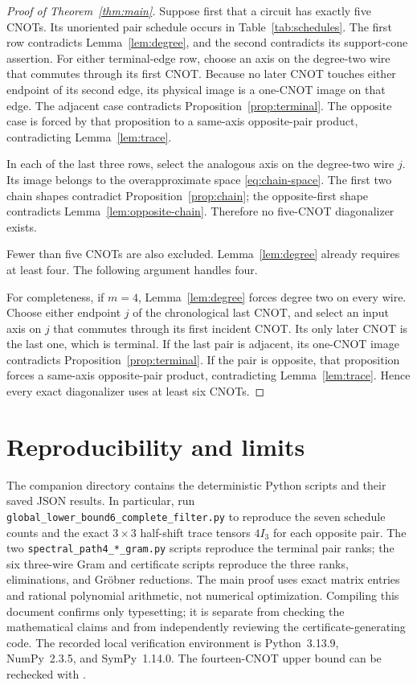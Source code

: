 \documentclass[11pt]{article}
\begin{document}
\begin{proof}[Proof of Theorem~\ref{thm:main}]
Suppose first that a circuit has exactly five CNOTs.  Its unoriented
pair schedule occurs in Table~\ref{tab:schedules}.  The first row
contradicts Lemma~\ref{lem:degree}, and the second contradicts its
support-cone assertion.  For either terminal-edge row, choose an axis on
the degree-two wire that commutes through its first CNOT.  Because no
later CNOT touches either endpoint of its second edge, its physical
image is a one-CNOT image on that edge.  The adjacent case contradicts
Proposition~\ref{prop:terminal}.  The opposite case is forced by that
proposition to a same-axis opposite-pair product, contradicting
Lemma~\ref{lem:trace}.

In each of the last three rows, select the analogous axis on the
degree-two wire $j$.  Its image belongs to the overapproximate space
\eqref{eq:chain-space}.  The first two chain shapes contradict
Proposition~\ref{prop:chain}; the opposite-first shape contradicts
Lemma~\ref{lem:opposite-chain}.  Therefore no five-CNOT diagonalizer
exists.

Fewer than five CNOTs are also excluded.  Lemma~\ref{lem:degree}
already requires at least four.  The following argument handles four.

For completeness, if $m=4$, Lemma~\ref{lem:degree} forces degree two
on every wire.  Choose either endpoint $j$ of the chronological last
CNOT, and select an input axis on $j$ that commutes through its first
incident CNOT.  Its only later CNOT is the last one, which is terminal.
If the last pair is adjacent, its one-CNOT image contradicts
Proposition~\ref{prop:terminal}.  If the pair is opposite, that
proposition forces a same-axis opposite-pair product, contradicting
Lemma~\ref{lem:trace}.  Hence every exact diagonalizer uses at least
six CNOTs.
\end{proof}

\section{Reproducibility and limits}

The companion directory contains the deterministic Python scripts and
their saved JSON results.  In particular, run
\texttt{global\_lower\_bound6\_complete\_filter.py} to reproduce
the seven schedule counts and the exact $3\times3$ half-shift trace
tensors $4I_3$ for each opposite pair.  The two
\texttt{spectral\_path4\_*\_gram.py} scripts reproduce the terminal
pair ranks; the six three-wire Gram and certificate scripts reproduce
the three ranks, eliminations, and Gr\"obner reductions.  The main
proof uses exact matrix entries and rational polynomial arithmetic,
not numerical optimization.  Compiling this document confirms only
typesetting; it is separate from checking the mathematical claims and
from independently reviewing the certificate-generating code.
The recorded local verification environment is Python~3.13.9,
NumPy~2.3.5, and SymPy~1.14.0.  The fourteen-CNOT upper bound can be
rechecked with .
\end{document}
